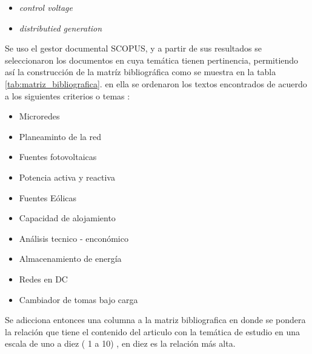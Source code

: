 \documentclass[12pt, letterpaper]{report}
\begin{document}
\begin{itemize}
	\item \textit{control voltage}
	\item \textit{distributied generation}
\end{itemize}

Se uso el gestor documental SCOPUS, y  a partir de sus resultados se seleccionaron los documentos en cuya temática tienen pertinencia, permitiendo así la construcción de la matríz bibliográfica como se muestra en la tabla \ref{tab:matriz_bibliografica}. en ella se ordenaron los textos encontrados de acuerdo a los siguientes criterios o temas :\\

\begin{itemize}
	\item Microredes
	\item Planeaminto de la red
	\item Fuentes fotovoltaicas
	\item Potencia activa y reactiva
	\item Fuentes Eólicas
	\item Capacidad de alojamiento
	\item Análisis tecnico - enconómico
	\item Almacenamiento de energía
	\item Redes en DC
	\item Cambiador de tomas bajo carga
\end{itemize}

Se adicciona entonces una columna a la matriz bibliografica en donde se pondera la relación que tiene el contenido del articulo con la temática de estudio en una escala de uno a diez ( 1 a 10) , en diez es la relación más alta.\\
\end{document}

